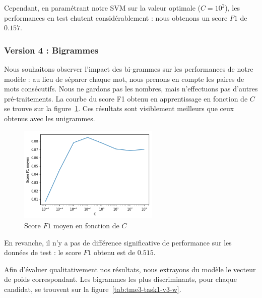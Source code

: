 \documentclass[a4paper]{article}
\newcommand{\figref}[1]{figure~\ref{#1}}
\begin{document}
Cependant, en paramétrant notre SVM sur la valeur optimale ($C=10^2$), les
performances en test chutent considérablement : nous obtenons un score $F1$ de
$0.157$. 


\subsubsection{Version 4 : Bigrammes}

Nous souhaitons observer l'impact des bi-grammes sur les performances de notre
modèle : au lieu de séparer chaque mot, nous prenons en compte les paires de
mots consécutifs. Nous ne gardons pas les nombres, mais n'effectuons pas d'autres
pré-traitements. La courbe du score F1 obtenu en apprentissage en fonction de
$C$ se trouve sur la \figref{img:tme2-task1-v3}. Ces résultats sont visiblement
meilleurs que ceux obtenus avec les unigrammes.

\begin{figure}[H]
	\center 
	\includegraphics[width=0.6\textwidth]{images/tme2/task1_v3.png}
    \caption{Score $F1$ moyen en fonction de $C$}
    \label{img:tme2-task1-v3}
\end{figure}

En revanche, il n'y a pas de différence significative de performance sur les
données de test : le score $F1$ obtenu est de $0.515$. 

Afin d'évaluer qualitativement nos résultats, nous extrayons du modèle le
vecteur de poids correspondant. Les bigrammes les plus discriminants, pour
chaque candidat, se trouvent sur la \figref{tab:tme3-task1-v3-w}.
\end{document}
